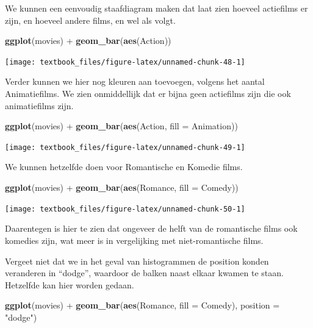 \documentclass[]{tufte-book}
\newenvironment{Shaded}{}{}
\newcommand{\DataTypeTok}[1]{\textcolor[rgb]{0.56,0.13,0.00}{#1}}
\newcommand{\KeywordTok}[1]{\textcolor[rgb]{0.00,0.44,0.13}{\textbf{#1}}}
\newcommand{\NormalTok}[1]{#1}
\newcommand{\OperatorTok}[1]{\textcolor[rgb]{0.40,0.40,0.40}{#1}}
\newcommand{\StringTok}[1]{\textcolor[rgb]{0.25,0.44,0.63}{#1}}
\begin{document}
We kunnen een eenvoudig staafdiagram maken dat laat zien hoeveel actiefilms er zijn, en hoeveel andere films, en wel als volgt.

\begin{Shaded}
\begin{Highlighting}[]
\KeywordTok{ggplot}\NormalTok{(movies) }\OperatorTok{+}
\StringTok{    }\KeywordTok{geom_bar}\NormalTok{(}\KeywordTok{aes}\NormalTok{(Action))}
\end{Highlighting}
\end{Shaded}

\texttt{[image: textbook\_files/figure-latex/unnamed-chunk-48-1]}

Verder kunnen we hier nog kleuren aan toevoegen, volgens het aantal Animatiefilms. We zien onmiddellijk dat er bijna geen actiefilms zijn die ook animatiefilms zijn.

\begin{Shaded}
\begin{Highlighting}[]
\KeywordTok{ggplot}\NormalTok{(movies) }\OperatorTok{+}
\StringTok{    }\KeywordTok{geom_bar}\NormalTok{(}\KeywordTok{aes}\NormalTok{(Action, }\DataTypeTok{fill =}\NormalTok{ Animation)) }
\end{Highlighting}
\end{Shaded}

\texttt{[image: textbook\_files/figure-latex/unnamed-chunk-49-1]}

We kunnen hetzelfde doen voor Romantische en Komedie films.

\begin{Shaded}
\begin{Highlighting}[]
\KeywordTok{ggplot}\NormalTok{(movies) }\OperatorTok{+}
\StringTok{    }\KeywordTok{geom_bar}\NormalTok{(}\KeywordTok{aes}\NormalTok{(Romance, }\DataTypeTok{fill =}\NormalTok{ Comedy)) }
\end{Highlighting}
\end{Shaded}

\texttt{[image: textbook\_files/figure-latex/unnamed-chunk-50-1]}

Daarentegen is hier te zien dat ongeveer de helft van de romantische films ook komedies zijn, wat meer is in vergelijking met niet-romantische films.

Vergeet niet dat we in het geval van histogrammen de position konden veranderen in ``dodge'', waardoor de balken naast elkaar kwamen te staan. Hetzelfde kan hier worden gedaan.

\begin{Shaded}
\begin{Highlighting}[]
\KeywordTok{ggplot}\NormalTok{(movies) }\OperatorTok{+}
\StringTok{    }\KeywordTok{geom_bar}\NormalTok{(}\KeywordTok{aes}\NormalTok{(Romance, }\DataTypeTok{fill =}\NormalTok{ Comedy), }\DataTypeTok{position =} \StringTok{"dodge"}\NormalTok{) }
\end{Highlighting}
\end{Shaded}
\end{document}
